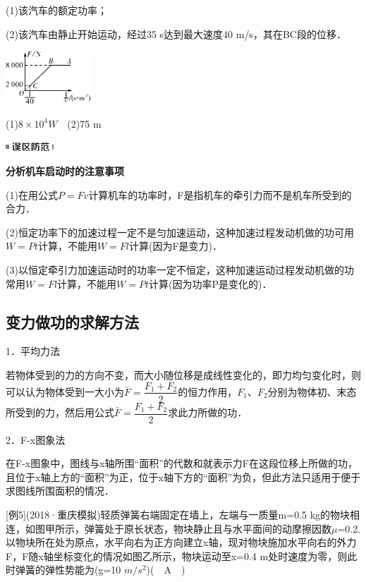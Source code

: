 (1)该汽车的额定功率；

(2)该汽车由静止开始运动，经过35 s达到最大速度40 m/s，其在BC段的位移．

\begin{center}\includegraphics[width=1.25in,height=0.78125in]{media/image212.png}\end{center}

\begin{solution}
	(1)$8\times 10^4 W$　(2)75 m
\end{solution}
\begin{center}\includegraphics[width=0.70833in,height=0.125in]{media/image34.png}

\textbf{分析机车启动时的注意事项}
\end{center}


(1)在用公式$P=Fv$计算机车的功率时，F是指机车的牵引力而不是机车所受到的合力．

(2)恒定功率下的加速过程一定不是匀加速运动，这种加速过程发动机做的功可用$W=Pt$计算，不能用$W=Fl$计算(因为F是变力)．

(3)以恒定牵引力加速运动时的功率一定不恒定，这种加速运动过程发动机做的功常用$W=Fl$计算，不能用$W=Pt$计算(因为功率P是变化的)．

\subsection{变力做功的求解方法}

1．平均力法

若物体受到的力的方向不变，而大小随位移是成线性变化的，即力均匀变化时，则可以认为物体受到一大小为$\bar{F}=\dfrac{F_{1}+F_{2}}{2}$的恒力作用，$F_1$、$F_2$分别为物体初、末态所受到的力，然后用公式$\bar{F}=\dfrac{F_{1}+F_{2}}{2}$求此力所做的功．



2．F-x图象法

在F-x图象中，图线与x轴所围``面积''的代数和就表示力F在这段位移上所做的功，且位于x轴上方的``面积''为正，位于x轴下方的``面积''为负，但此方法只适用于便于求图线所围面积的情况．

{[}例5{]}(2018·重庆模拟)轻质弹簧右端固定在墙上，左端与一质量m=0.5
kg的物块相连，如图甲所示，弹簧处于原长状态，物块静止且与水平面间的动摩擦因数$\mu$=0.2.以物块所在处为原点，水平向右为正方向建立x轴，现对物块施加水平向右的外力F，F随x轴坐标变化的情况如图乙所示，物块运动至x=0.4
m处时速度为零，则此时弹簧的弹性势能为(g=10 $m/s^2$)(　A　)

